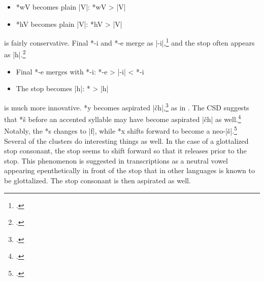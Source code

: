 \documentclass[output=paper]{LSP/langsci}
\begin{document}
\begin{itemize}
\item *wV becomes plain |V|: \hspace{1em} *wV	>	|V|
\item *hV becomes plain |V|: \hspace{1em} *hV	>	|V|
\end{itemize}


 is fairly conservative.  Final *-i and *-e merge as |-i|,\footnote{\citealt[901]{Rankinetal2006PDF}.}  and the  stop often appears as |h|.\footnote{\citealt[103]{Rankinetal2006PDF}.} 

\begin{itemize}
\item Final *-e merges with *-i: \hspace{2.1em} *-e	>	|-i|	<	*-i
\item The  stop becomes |h|: \hspace{1em} *\textsuperscript{}	>	|h|
\end{itemize}


 is much more innovative.   *y becomes aspirated |\v{c}h|,\footnote{\citealt[85, 242]{Rankinetal2006PDF}.} as in .  The CSD suggests that  *š before an accented syllable may have become aspirated |\v{c}h| as well.\footnote{\citealt[827]{Rankinetal2006PDF}.} Notably, the *s  changes to |f|, while  *x shifts forward to become a neo-|š|.\footnote{\citealt[174, 299]{Rankinetal2006PDF}.} Several of the  clusters do interesting things as well.  In the case of a glottalized stop consonant, the  stop seems to shift forward so that it releases prior to the stop.  This phenomenon is suggested in  transcriptions as a neutral vowel appearing epenthetically in front of the stop that in other languages is known to be glottalized.  The stop consonant is then aspirated as well.
\end{document}
